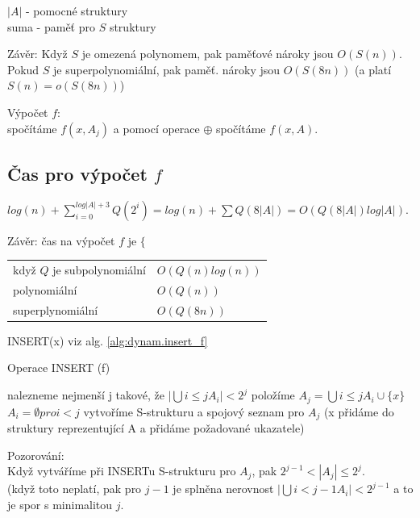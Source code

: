 $|A|$ - pomocné struktury \\
suma - paměť pro $S$ struktury
\par
Závěr: Když $S$ je omezená polynomem, pak paměťové nároky jsou $O(S(n))$.
Pokud $S$ je superpolynomiální, pak paměť. nároky jsou $O(S(8n))$
(a platí $S(n) = o(S(8n))$)
\par

Výpočet $f$: \\
spočítáme $f(x,A_j)$ a pomocí operace $\oplus$ spočítáme $f(x,A)$.

\subsection{Čas pro výpočet $f$}

$log(n) + \sum_{i=0}^{log|A|+3} Q(2^i) = log(n) + \sum Q(8|A|) =
O(Q(8|A|) log|A|)$.
\par

Závěr: čas na výpočet $f$ je
$\Biggl\{$
\begin{tabular}{ll}
když $Q$ je subpolynomiální & $O(Q(n)log(n))$ \\
polynomiální & $O(Q(n))$ \\
superplynomiální & $O(Q(8n))$ \\
\end{tabular}


INSERT(x) viz alg. \ref{alg:dynam.insert_f}

\begin{algorithm}[!htb]
\caption{Operace INSERT (f)}
\label{alg:dynam.insert_f}
\begin{algorithmic}
  \STATE nalezneme nejmenší j takové, že $|\bigcup i \leq j A_i| < 2^j$
\STATE položíme $A_j = \bigcup{i\leq j}A_i \cup \{x\}$
\STATE $A_i = \emptyset pro i < j$
\STATE vytvoříme S-strukturu a spojový seznam pro $A_j$ (x přidáme do
struktury reprezentující A a přidáme požadované ukazatele)
\ENDIF  
\end{algorithmic}
\end{algorithm}

\par
Pozorování:\\
Když vytváříme při INSERTu S-strukturu pro $A_j$, pak $2^{j-1} < |A_j|
\leq 2^j$. \\
(když toto neplatí, pak pro $j-1$ je splněna nerovnost $|\bigcup{i<j-1} A_i|
< 2^{j-1}$ a to je spor s minimalitou $j$.
\par

